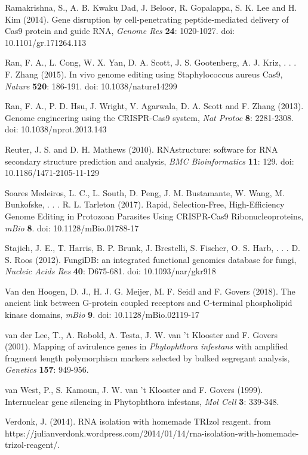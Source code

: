 \documentclass[onecolumn, 11pt,openany]{memoir}
\begin{document}
\begin{multicols}{2}
\begin{sloppy}
\begin{footnotesize}
Ramakrishna, S., A. B. Kwaku Dad, J. Beloor, R. Gopalappa, S. K. Lee and H. Kim (2014). Gene disruption by cell-penetrating peptide-mediated delivery of Cas9 protein and guide RNA, \textit{Genome Res} \textbf{24}: 1020-1027. doi: 10.1101/gr.171264.113

Ran, F. A., L. Cong, W. X. Yan, D. A. Scott, J. S. Gootenberg, A. J. Kriz, . . . F. Zhang (2015). In vivo genome editing using Staphylococcus aureus Cas9, \textit{Nature} \textbf{520}: 186-191. doi: 10.1038/nature14299

Ran, F. A., P. D. Hsu, J. Wright, V. Agarwala, D. A. Scott and F. Zhang (2013). Genome engineering using the CRISPR-Cas9 system, \textit{Nat Protoc} \textbf{8}: 2281-2308. doi: 10.1038/nprot.2013.143

Reuter, J. S. and D. H. Mathews (2010). RNAstructure: software for RNA secondary structure prediction and analysis, \textit{BMC Bioinformatics} \textbf{11}: 129. doi: \mbox{10.1186/1471-2105-11-129}

Soares Medeiros, L. C., L. South, D. Peng, J. M. Bustamante, W. Wang, M. Bunkofske, . . . R. L. Tarleton (2017). Rapid, Selection-Free, High-Efficiency Genome Editing in Protozoan Parasites Using CRISPR-Cas9 Ribonucleoproteins, \textit{mBio} \textbf{8}. doi: 10.1128/mBio.01788-17

Stajich, J. E., T. Harris, B. P. Brunk, J. Brestelli, S. Fischer, O. S. Harb, . . . D. S. Roos (2012). FungiDB: an integrated functional genomics database for fungi, \textit{Nucleic Acids Res} \textbf{40}: D675-681. doi: 10.1093/nar/gkr918

Van den Hoogen, D. J., H. J. G. Meijer, M. F. Seidl and F. Govers (2018). The ancient link between G-protein coupled receptors and C-terminal phospholipid kinase domains, \textit{mBio} \textbf{9}. doi: 10.1128/mBio.02119-17

van der Lee, T., A. Robold, A. Testa, J. W. van 't Klooster and F. Govers (2001). Mapping of avirulence genes in \textit{Phytophthora infestans} with amplified fragment length polymorphism markers selected by bulked segregant analysis, \textit{Genetics} \textbf{157}: 949-956. 

van West, P., S. Kamoun, J. W. van 't Klooster and F. Govers (1999). Internuclear gene silencing in Phytophthora infestans, \textit{Mol Cell} \textbf{3}: 339-348.

Verdonk, J. (2014). RNA isolation with homemade TRIzol reagent. from https://julianverdonk.wordpress.com/2014/01/14/rna-isolation-with-homemade-trizol-reagent/.


\end{footnotesize}
\end{sloppy}
\end{multicols}
\end{document}
